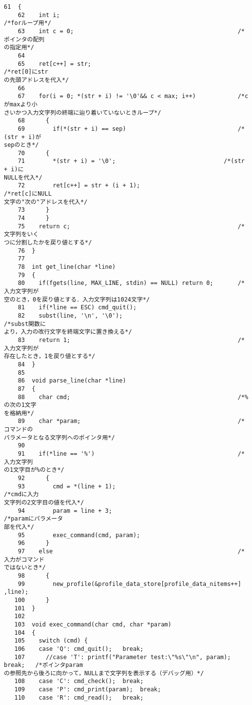 \begin{Verbatim}[fontsize=\small, baselinestretch=0.8]
    61	{
    62	  int i;                                                   /*forループ用*/
    63	  int c = 0;                                               /*ポインタの配列
の指定用*/
    64	
    65	  ret[c++] = str;                                            /*ret[0]にstr
の先頭アドレスを代入*/
    66	
    67	  for(i = 0; *(str + i) != '\0'&& c < max; i++)            /*cがmaxより小
さいかつ入力文字列の終端に辿り着いていないときループ*/
    68	    {
    69	      if(*(str + i) == sep)                                /*(str + i)が
sepのとき*/
    70		{
    71		  *(str + i) = '\0';                               /*(str + i)に
NULLを代入*/
    72		  ret[c++] = str + (i + 1);                          /*ret[c]にNULL
文字の"次の"アドレスを代入*/
    73		}
    74	    }
    75	  return c;                                                /*文字列をいく
つに分割したかを戻り値とする*/
    76	}
    77	
    78	int get_line(char *line)
    79	{
    80	  if(fgets(line, MAX_LINE, stdin) == NULL) return 0;       /*入力文字列が
空のとき，0を戻り値とする．入力文字列は1024文字*/
    81	  if(*line == ESC) cmd_quit();
    82	  subst(line, '\n', '\0');                                 /*subst関数に
より，入力の改行文字を終端文字に置き換える*/
    83	  return 1;                                                /*入力文字列が
存在したとき，1を戻り値とする*/
    84	}
    85	
    86	void parse_line(char *line)
    87	{
    88	  char cmd;                                                /*%の次の1文字
を格納用*/
    89	  char *param;                                             /*コマンドの
パラメータとなる文字列へのポインタ用*/
    90	
    91	  if(*line == '%')                                         /*入力文字列
の1文字目が%のとき*/
    92	    {
    93	      cmd = *(line + 1);                                   /*cmdに入力
文字列の2文字目の値を代入*/
    94	      param = line + 3;                                    /*paramにパラメータ
部を代入*/
    95	      exec_command(cmd, param);
    96	    }
    97	  else                                                     /*入力がコマンド
ではないとき*/
    98	    {
    99	      new_profile(&profile_data_store[profile_data_nitems++] ,line);
   100	    }
   101	}
   102	
   103	void exec_command(char cmd, char *param)
   104	{
   105	  switch (cmd) {
   106	  case 'Q': cmd_quit();   break;
   107	    //case 'T': printf("Parameter test:\"%s\"\n", param); break;   /*ポインタparam
の参照先から後ろに向かって，NULLまで文字列を表示する（デバッグ用）*/
   108	  case 'C': cmd_check();  break;
   109	  case 'P': cmd_print(param);  break;
   110	  case 'R': cmd_read();   break;

\end{Verbatim}
